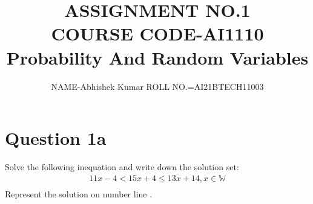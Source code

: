 \documentclass[11pt,two column]{article}
\begin{document}
\title{ASSIGNMENT NO.1  \\COURSE CODE-AI1110\\ Probability And Random Variables }
\author{NAME-Abhishek Kumar ROLL NO.=AI21BTECH11003}
\maketitle
\section*{ Question 1a}
 Solve the following inequation and write down the solution set:\\
\begin{align}
 11x-4 < 15x+4\le13x+14\nonumber,  x\in \mathbb{W}\\\nonumber
\end{align}
Represent the solution on number line .
\end{document}
